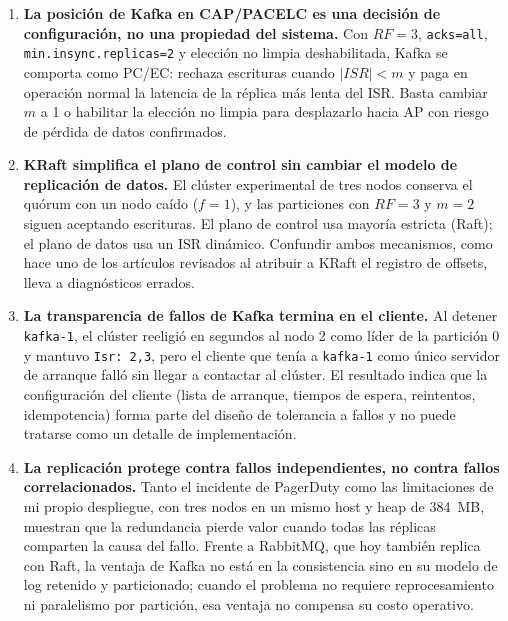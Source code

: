\documentclass[11pt,a4paper]{article}
\begin{document}
\begin{enumerate}
\item \textbf{La posición de Kafka en CAP/PACELC es una decisión de configuración, no una propiedad del sistema.} Con $RF=3$, \texttt{acks=all}, \texttt{min.insync.replicas=2} y elección no limpia deshabilitada, Kafka se comporta como PC/EC: rechaza escrituras cuando $|ISR| < m$ y paga en operación normal la latencia de la réplica más lenta del ISR. Basta cambiar $m$ a 1 o habilitar la elección no limpia para desplazarlo hacia AP con riesgo de pérdida de datos confirmados.

\item \textbf{KRaft simplifica el plano de control sin cambiar el modelo de replicación de datos.} El clúster experimental de tres nodos conserva el quórum con un nodo caído ($f=1$), y las particiones con $RF=3$ y $m=2$ siguen aceptando escrituras. El plano de control usa mayoría estricta (Raft); el plano de datos usa un ISR dinámico. Confundir ambos mecanismos, como hace uno de los artículos revisados al atribuir a KRaft el registro de offsets, lleva a diagnósticos errados.

\item \textbf{La transparencia de fallos de Kafka termina en el cliente.} Al detener \texttt{kafka-1}, el clúster reeligió en segundos al nodo 2 como líder de la partición 0 y mantuvo \texttt{Isr: 2,3}, pero el cliente que tenía a \texttt{kafka-1} como único servidor de arranque falló sin llegar a contactar al clúster. El resultado indica que la configuración del cliente (lista de arranque, tiempos de espera, reintentos, idempotencia) forma parte del diseño de tolerancia a fallos y no puede tratarse como un detalle de implementación.

\item \textbf{La replicación protege contra fallos independientes, no contra fallos correlacionados.} Tanto el incidente de PagerDuty como las limitaciones de mi propio despliegue, con tres nodos en un mismo host y heap de 384~MB, muestran que la redundancia pierde valor cuando todas las réplicas comparten la causa del fallo. Frente a RabbitMQ, que hoy también replica con Raft, la ventaja de Kafka no está en la consistencia sino en su modelo de log retenido y particionado; cuando el problema no requiere reprocesamiento ni paralelismo por partición, esa ventaja no compensa su costo operativo.
\end{enumerate}

\end{document}

